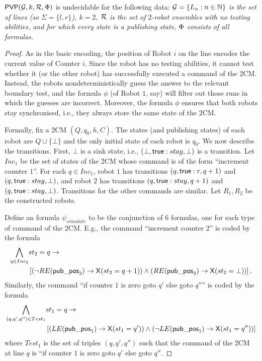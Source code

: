 \begin{theorem} \label{thm:undec-lines-no testing}
$\mathsf{PVP}(\mathcal{G},k,\mathcal{R},\Phi)$ is undecidable for the following data:
\it
\- $\mathcal{G} = \{L_n : n \in \mathbb{N}\}$ is the set of lines (so $\Sigma = \{l,r\}$),
\- $k = 2$,
\- $\mathcal{R}$ is the set of $2$-robot ensembles with no testing abilities, and for which every state is a publishing state,
\- $\Phi$ consists of all \RLTL formulas.
\ti
\end{theorem}



\begin{proof}
As in the basic encoding, the position of Robot $i$ on the line encodes the current value of Counter $i$. Since the robot has no testing abilities, it cannot test whether it (or the other robot) has successfully executed a
command of the 2CM. Instead, the robots nondeterministically guess the answer to the relevant boundary test, and the formula $\phi$ (of Robot $1$, say) will filter out those runs in which the guesses are incorrect. Moreover, the formula $\phi$ ensures that both robots stay synchronised, i.e., they always store the same state of the 2CM.

Formally, fix a 2CM $(Q,q_0,h,C)$. The states (and publishing states) of each robot are $Q \cup \{\bot\}$ and the only initial state of each robot is $q_0$.  
We now describe the transitions. First, $\bot$ is a sink state, i.e., $(\bot,\mathsf{true}:stay,\bot)$ is a transition. Let $Inc_1$ be the set of states of the 2CM whose command is of the form ``increment counter $1$''. For each $q \in Inc_1$,
robot $1$ has transitions $(q,\mathsf{true}:r,q+1)$ and $(q,\mathsf{true}:stay,\bot)$, and
robot $2$ has transitions $(q,\mathsf{true}:stay,q+1)$ and $(q,\mathsf{true}:stay,\bot)$. Transitions for the other commands are similar. Let $R_1,R_2$ be the constructed robots.

Define an \RLTL formula $\psi_{simulate}$ to be the conjunction of 6 formulas, one for each type of command of the 2CM. E.g., the command ``increment counter $2$'' is coded by the formula 
\begin{align*}
 \bigwedge_{q \in Inc_2} & st_2 = q  \rightarrow \\
 & \left[(\neg RE(\mathsf{pub\_pos}_2) \rightarrow \operatorname{\mathsf{X}}(st_2 = q+1)) \wedge (RE(\mathsf{pub\_pos}_2) \rightarrow \operatorname{\mathsf{X}}(st_2 = \bot))\right].
\end{align*}
Similarly, the command ``if counter $1$ is zero goto $q'$ else goto $q''$'' is coded by the formula
\begin{align*}
 \bigwedge_{(q,q',q'') \in Test_1} & st_1 = q \rightarrow \\
 & \left[(LE(\mathsf{pub\_pos}_1) \rightarrow \operatorname{\mathsf{X}}(st_1 = q')) \wedge (\neg LE(\mathsf{pub\_pos}_1) \rightarrow \operatorname{\mathsf{X}}(st_1 = q''))\right]
\end{align*}
where $Test_1$ is the set of triples $(q,q',q'')$ such that the command of the 2CM at line $q$ is ``if counter $1$ is zero goto $q'$ else goto $q''$.




\end{proof}
